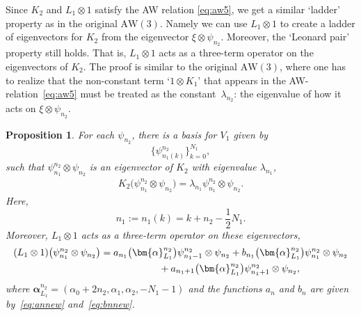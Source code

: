 \documentclass[pdftex]{sigma}
\numberwithin{equation}{section}
\newtheorem{Proposition}[Theorem]{Proposition}
 { \theoremstyle{definition}
\newtheorem{Definition}[Theorem]{Definition}
\newtheorem{Note}[Theorem]{Note}
\newtheorem{Example}[Theorem]{Example}
\newtheorem{Remark}[Theorem]{Remark} }
\newcommand{\aw}{\mathrm{AW}\!\left(3\right)}
\newcommand{\half}{\frac{1}{2}}
\begin{document}
Since $K_2$ and $L_1\otimes 1$ satisfy the AW relation \eqref{eq:aw5}, we get a similar `ladder' property as in the original $\aw$. Namely we can use $L_1\otimes 1$ to create a ladder of eigenvectors for $K_2$ from the eigenvector $\xi\otimes\psi_{n_2}$. Moreover, the `Leonard pair' property still holds. That is, $L_1\otimes 1$ acts as a three-term operator on the eigenvectors of $K_2$. The proof is similar to the original $\aw$, where one has to realize that the non-constant term `$1\otimes K_1$' that appears in the AW-relation~\eqref{eq:aw5} must be treated as the constant~$\lambda_{n_2}$: the eigenvalue of how it acts on $\xi\otimes \psi_{n_2}$.
\begin{Proposition}\label{prop:opnieuw3term}
	For each $\psi_{n_2}$, there is a basis for $V_1$ given by
	\[
	\big\{\psi_{n_1(k)}^{n_2}\big\}_{k=0}^{N_1},
	\]
	such that $\psi_{n_1}^{n_2}\otimes\psi_{n_2}$ is an eigenvector of $K_2$ with eigenvalue $\lambda_{n_1}$,
	\begin{gather*}
		K_2\big(\psi_{n_1}^{n_2}\otimes\psi_{n_2}\big) = \lambda_{n_1}\psi_{n_1}^{n_2}\otimes\psi_{n_2}.
	\end{gather*}
	Here,
	\[
	n_1:=n_1(k)=k+n_2-\half N_1.
	\]
	Moreover, $L_1\otimes 1$ acts as a three-term operator on these eigenvectors,
	\begin{gather*}
(L_1\otimes 1)\big(\psi_{n_1}^{n_2}\otimes\psi_{n_2}\big)= a_{n_1}\big(\bm{\alpha}_{L_1}^{n_2}\big) \psi_{n_1-1}^{n_2}\otimes\psi_{n_2} + b_{n_1}\big(\bm{\alpha}_{L_1}^{n_2}\big) \psi_{n_1}^{n_2}\otimes\psi_{n_2} \\
\hphantom{(L_1\otimes 1)\big(\psi_{n_1}^{n_2}\otimes\psi_{n_2}\big)=}{}
			 + a_{n_1+1}\big(\bm{\alpha}_{L_1}^{n_2}\big)\psi_{n_1+1}^{n_2}\otimes\psi_{n_2}, %
	\end{gather*}
	where $\bm{\alpha}_{L_1}^{n_2}=(\alpha_0+2n_2,\alpha_1,\alpha_2,-N_1-1)$ and the functions $a_{n}$ and $b_{n}$ are given by~\eqref{eq:annew} and~\eqref{eq:bnnew}.
\end{Proposition}
\end{document}
